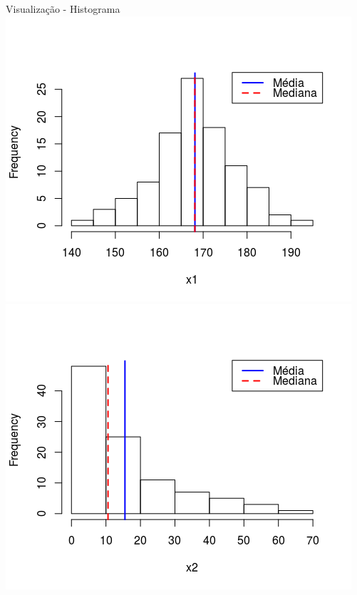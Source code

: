 \documentclass{beamer}
\begin{document}
\begin{frame}{Visualização - Histograma}
  \centering
  \includegraphics[width=.5\textwidth]{Nao_Param/normal2-h}
  \includegraphics[width=.5\textwidth]{Nao_Param/lognormal2-h}
\end{frame}
\end{document}
